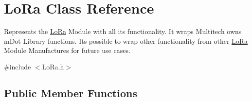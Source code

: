 \hypertarget{class_lo_ra}{}\section{Lo\+Ra Class Reference}
\label{class_lo_ra}


Represents the \hyperlink{class_lo_ra}{Lo\+Ra} Module with all its functionality. It wraps Multitech owns m\+Dot Library functions. It\textquotesingle{}s possible to wrap other functionality from other \hyperlink{class_lo_ra}{Lo\+Ra} Module Manufactures for future use cases.  




{\ttfamily \#include $<$Lo\+Ra.\+h$>$}

\subsection*{Public Member Functions}
